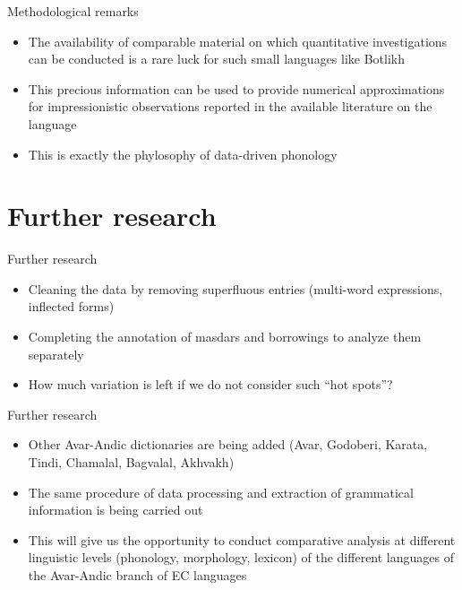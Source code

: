 \begin{frame}{Methodological remarks}
\begin{itemize}
    \item The availability of comparable material on which quantitative investigations can be conducted is a rare luck for such small languages like Botlikh
    \item This precious information can be used to provide numerical approximations for impressionistic observations reported in the available literature on the language
    \item This is exactly the phylosophy of data-driven phonology
\end{itemize}
\end{frame}

\section{Further research}

\begin{frame}{Further research}
\begin{itemize}
    \item Cleaning the data by removing superfluous entries (multi-word expressions, inflected forms)
    \item Completing the annotation of masdars and borrowings to analyze them separately
    \item How much variation is left if we do not consider such ``hot spots''?
\end{itemize}
\end{frame}

\begin{frame}{Further research}
\begin{itemize}
    \item Other Avar-Andic dictionaries are being added (Avar, Godoberi, Karata, Tindi, Chamalal, Bagvalal, Akhvakh)
    \item The same procedure of data processing and extraction of grammatical information is being carried out
    \item This will give us the opportunity to conduct comparative analysis at different linguistic levels (phonology, morphology, lexicon) of the different languages of the Avar-Andic branch of EC languages
\end{itemize}
\end{frame}

